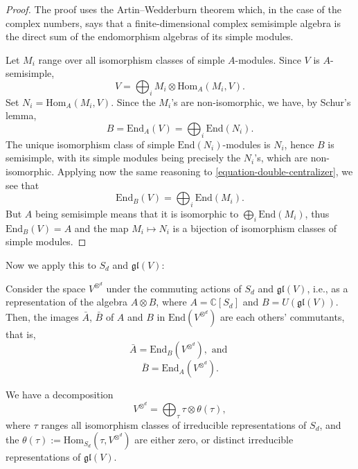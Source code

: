 \begin{proof}
The proof uses the Artin--Wedderburn theorem which, in the case of the complex numbers, says that a finite-dimensional complex semisimple algebra is the direct sum of the endomorphism algebras of its simple modules. 

Let $M_i$ range over all isomorphism classes of simple $A$-modules. Since $V$ is $A$-semisimple, 
 \begin{equation}
  \label{equation-double-centralizer}
  V = \bigoplus_i M_i\otimes \text{Hom}_A(M_i, V).
 \end{equation}
 Set $N_i=\text{Hom}_A(M_i, V)$. Since the $M_i$'s are non-isomorphic, we have, by Schur's lemma, 
 $$ B=\text{End}_A(V) = \bigoplus_i \text{End}(N_i).$$
 The unique isomorphism class of simple $\text{End}(N_i)$-modules is $N_i$, hence $B$ is semisimple, with its simple modules being precisely the $N_i$'s, which are non-isomorphic. Applying now the same reasoning to \eqref{equation-double-centralizer}, we see that 
 $$ \text{End}_B(V) = \bigoplus_i \text{End}(M_i).$$
 But $A$ being semisimple means that it is isomorphic to $\bigoplus_i \text{End}(M_i)$, thus $\text{End}_B(V)=A$ and the map $M_i\mapsto N_i$ is a bijection of isomorphism classes of simple modules.
\end{proof}


Now we apply this to $S_d$ and $\mathfrak{gl}(V)$:


\begin{theorem}
\label{theorem-Schur-Weyl-centralizer}
 Consider the space $V^{\otimes^d}$ under the commuting actions of $S_d$ and $\mathfrak{gl}(V)$, i.e., as a representation of the algebra $A\otimes B$, where $A=\mathbb C[S_d]$ and $B=U(\mathfrak{gl}(V))$. Then, the images $\bar A$, $\bar B$ of $A$ and $B$ in $\text{End}(V^{\otimes^d})$ are each others' commutants, that is, 
 $$\bar A=\text{End}_B(V^{\otimes^d}),\mbox{ and }$$
 $$\bar B=\text{End}_A(V^{\otimes^d}).$$
 
 We have a decomposition 
\begin{equation}
 \label{equation-Schur-Weyl}
 V^{\otimes^d} = \bigoplus_{\tau} \tau \otimes \theta(\tau),
\end{equation}
 where $\tau$ ranges all isomorphism classes of irreducible representations of $S_d$, and the $\theta(\tau):= \text{Hom}_{S_d} (\tau, V^{\otimes^d})$ are either zero, or distinct irreducible representations of $\mathfrak{gl}(V)$.
\end{theorem}

